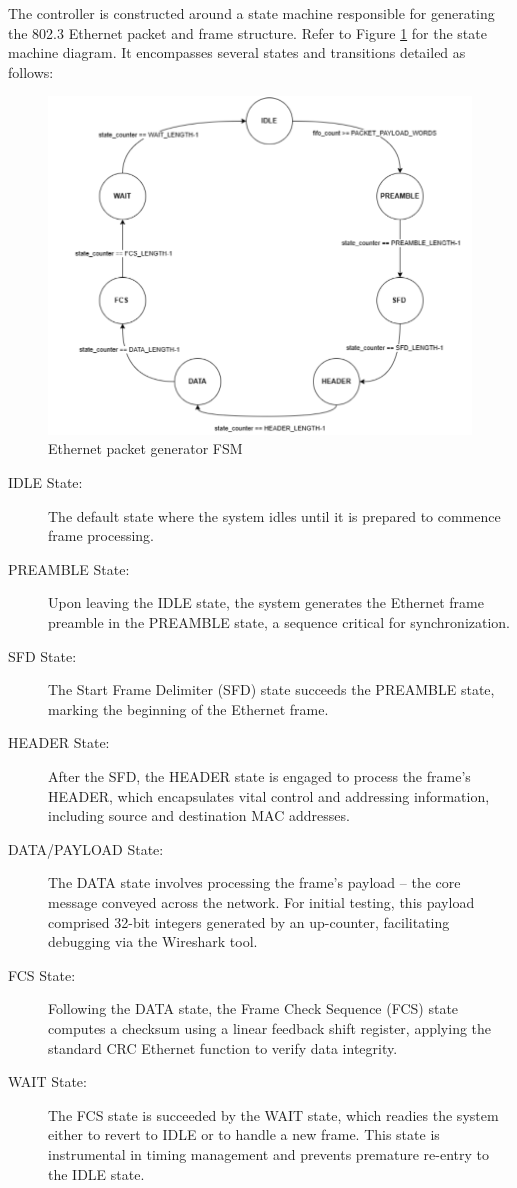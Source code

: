The controller is constructed around a state machine responsible for generating the 802.3 Ethernet packet and frame structure. Refer to Figure \ref{fig:eth-fsm} for the state machine diagram. It encompasses several states and transitions detailed as follows:
\begin{figure}
    \centering
    \includegraphics[width=0.75\linewidth]{Sections//IMPLEMENTATION//images/fsm_packet_gen.png}
    \caption{Ethernet packet generator FSM}
    \label{fig:eth-fsm}
\end{figure}
\begin{description}
    \item[IDLE State:] The default state where the system idles until it is prepared to commence frame processing.
    \item[PREAMBLE State:] Upon leaving the IDLE state, the system generates the Ethernet frame preamble in the PREAMBLE state, a sequence critical for synchronization.
    \item[SFD State:] The Start Frame Delimiter (SFD) state succeeds the PREAMBLE state, marking the beginning of the Ethernet frame.
    \item[HEADER State:] After the SFD, the HEADER state is engaged to process the frame's HEADER, which encapsulates vital control and addressing information, including source and destination MAC addresses.
    \item[DATA/PAYLOAD State:] The DATA state involves processing the frame's payload -- the core message conveyed across the network. For initial testing, this payload comprised 32-bit integers generated by an up-counter, facilitating debugging via the Wireshark tool.
    \item[FCS State:] Following the DATA state, the Frame Check Sequence (FCS) state computes a checksum using a linear feedback shift register, applying the standard CRC Ethernet function to verify data integrity.
    \item[WAIT State:] The FCS state is succeeded by the WAIT state, which readies the system either to revert to IDLE or to handle a new frame. This state is instrumental in timing management and prevents premature re-entry to the IDLE state.
\end{description}

